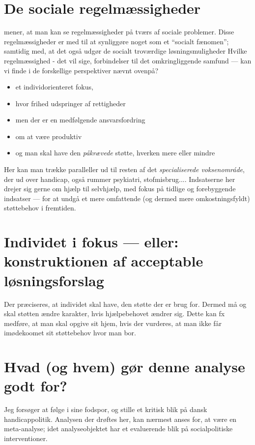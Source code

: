 \section{De sociale regelmæssigheder}

\citeauthor{scheurichPolicyArchaeologyNew1994} mener, at man kan se regelmæssigheder på tværs af sociale problemer.
Disse regelmæssigheder er med til at synliggøre noget som et “socialt fænomen”; samtidig med, at det også udgør de socialt troværdige løsningsmuligheder \cite[s. 301]{scheurichPolicyArchaeologyNew1994}
Hvilke regelmæssighed - det vil sige, forbindelser til det omkringliggende samfund — kan vi finde i de forskellige perspektiver nævnt ovenpå?

\begin{itemize}
  \item
    et individorienteret fokus, 
  \item
    hvor frihed udspringer af rettigheder
  \item
    men der er en medfølgende ansvarsfordring
  \item
    om at være produktiv
  \item
    og man skal have den \textit{påkrævede} støtte, hverken mere eller mindre
\end{itemize}

Her kan man trække paralleller ud til resten af det \textit{specialiserede voksenomráde}, der ud over handicap, også rummer psykiatri, stofmisbrug....
Indsatserne her drejer sig gerne om hjælp til selvhjælp, med fokus på tidlige og forebyggende indsatser — for at undgå et mere omfattende (og dermed mere omkostningsfyldt) støttebehov i fremtiden.

\section{Individet i fokus — eller: konstruktionen af acceptable løsningsforslag}
Der præciseres, at individet skal have, den støtte der er brug for.
Dermed må og skal støtten ændre karakter, hvis hjælpebehovet ændrer sig.
Dette kan fx medføre, at man skal opgive sit hjem, hvis der vurderes, at man ikke får imødekoomet sit støttebehov hvor man bor. 

\section{Hvad (og hvem) gør denne analyse godt for?}
Jeg forsøger at følge i  sine fodspor, og stille et kritisk blik på dansk handicappolitik.
Analysen der drøftes her, kan nærmest anses for, at være en meta-analyse; idet analyseobjektet har et evaluerende blik på socialpolitiske interventioner.
